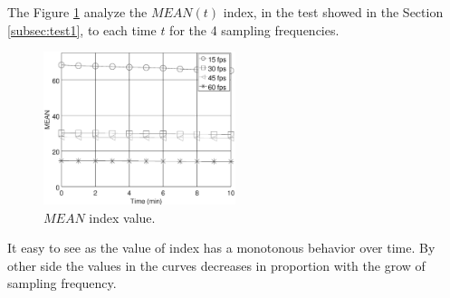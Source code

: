 \documentclass[review]{elsarticle}
\begin{document}
The Figure \ref{fig:MEANtest1} analyze the $MEAN(t)$ index,
in the test showed in the Section \ref{subsec:test1},
to each time $t$ for the  4 sampling frequencies.
\begin{figure}[ht!]
    \centering
    \includegraphics[width=0.5\textwidth]{FPS_f11_rawMEAN.eps}
    \caption{$MEAN$ index value.}\label{fig:MEANtest1}
\end{figure}
It easy to see as the value of index has a monotonous 
behavior over time. By other side the values in the curves decreases in proportion with 
the grow of sampling frequency.
\end{document}
